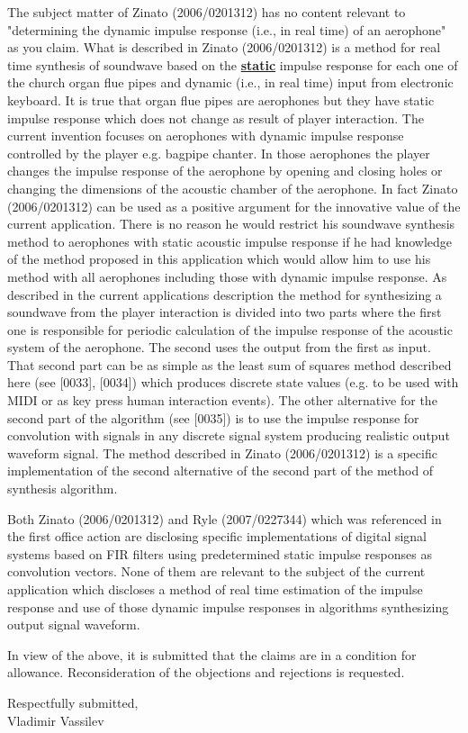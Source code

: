 The subject matter of Zinato (2006/0201312) has no content relevant to "determining the dynamic impulse response (i.e., in real time) of an aerophone" as you claim. What is described in Zinato (2006/0201312) is a method for real time synthesis of soundwave based on the \textbf{\underline{static}} impulse response for each one of the church organ flue pipes and dynamic (i.e., in real time) input from electronic keyboard. It is true that organ flue pipes are aerophones but they have static impulse response which does not change as result of player interaction. The current invention focuses on aerophones with dynamic impulse response controlled by the player e.g. bagpipe chanter. In those aerophones the player changes the impulse response of the aerophone by opening and closing holes or changing the dimensions of the acoustic chamber of the aerophone. In fact Zinato (2006/0201312) can be used as a positive argument for the innovative value of the current application. There is no reason he would restrict his soundwave synthesis method to aerophones with static acoustic impulse response if he had knowledge of the method proposed in this application which would allow him to use his method with all aerophones including those with dynamic impulse response. As described in the current applications description the method for synthesizing a soundwave from the player interaction is divided into two parts where the first one is responsible for periodic calculation of the impulse response of the acoustic system of the aerophone. The second uses the output from the first as input. That second part can be as simple as the least sum of squares method described here (see [0033], [0034]) which produces discrete state values (e.g. to be used with MIDI or as key press human interaction events). The other alternative for the second part of the algorithm (see [0035]) is to use the impulse response for convolution with signals in any discrete signal system producing realistic output waveform signal. The method described in Zinato (2006/0201312) is a specific implementation of the second alternative of the second part of the method of synthesis algorithm.

Both Zinato (2006/0201312) and Ryle (2007/0227344) which was referenced in the first office action are disclosing specific implementations of digital signal systems based on FIR filters using predetermined static impulse responses as convolution vectors. None of them are relevant to the subject of the current application which discloses a method of real time estimation of the impulse response and use of those dynamic impulse responses in algorithms synthesizing output signal waveform.


In view of the above, it is submitted that the claims are in a condition for allowance. Reconsideration of the objections and rejections is requested.

\setlength\parindent{3.6in}

Respectfully submitted, \\Vladimir Vassilev


